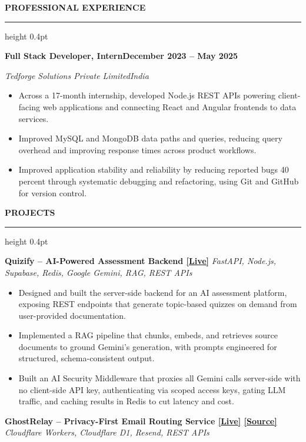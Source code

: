 \documentclass[10pt,a4paper]{article}
\newcommand{\resumeSection}[1]{%
  \vspace{5pt}
  {\normalsize\bfseries\color{heading} #1}\par
  \vspace{1pt}
  {\color{rulecolor}\hrule height 0.4pt}
  \vspace{3pt}
}
\newcommand{\resumeSubheading}[4]{%
  \textbf{#1}\hfill\textbf{#2}\par
  \textit{#3}\hfill\textit{#4}\par
  \vspace{-0.15em}
}
\newcommand{\projectHeading}[2]{%
  \textbf{#1} \textbar{} \textit{#2}\par
  \vspace{-0.15em}
}
\begin{document}
\normalsize

\resumeSection{PROFESSIONAL EXPERIENCE}

\resumeSubheading
{Full Stack Developer, Intern}
{December 2023 -- May 2025}
{Tedforge Solutions Private Limited}
{India}

\begin{itemize}
  \item Across a 17-month internship, developed Node.js REST APIs powering
  client-facing web applications and connecting React and Angular frontends
  to data services.

  \item Improved MySQL and MongoDB data paths and queries, reducing query
  overhead and improving response times across product workflows.

  \item Improved application stability and reliability by reducing reported
  bugs 40 percent through systematic debugging and refactoring, using Git and
  GitHub for version control.
\end{itemize}

\resumeSection{PROJECTS}

\projectHeading
{Quizify -- AI-Powered Assessment Backend \href{https://quizify.0xshiv.dev}{[Live]}}
{FastAPI, Node.js, Supabase, Redis, Google Gemini, RAG, REST APIs}

\begin{itemize}
  \item Designed and built the server-side backend for an AI assessment
  platform, exposing REST endpoints that generate topic-based quizzes on
  demand from user-provided documentation.

  \item Implemented a RAG pipeline that chunks, embeds, and retrieves source
  documents to ground Gemini's generation, with prompts engineered for
  structured, schema-consistent output.

  \item Built an AI Security Middleware that proxies all Gemini calls
  server-side with no client-side API key, authenticating via scoped access
  keys, gating LLM traffic, and caching results in Redis to cut latency
  and cost.
\end{itemize}

\projectHeading
{GhostRelay -- Privacy-First Email Routing Service \href{https://ghostrelay.me}{[Live]} \href{https://github.com/Tech-aficionado/GhostRelay---Open-Source}{[Source]}}
{Cloudflare Workers, Cloudflare D1, Resend, REST APIs}
\end{document}
